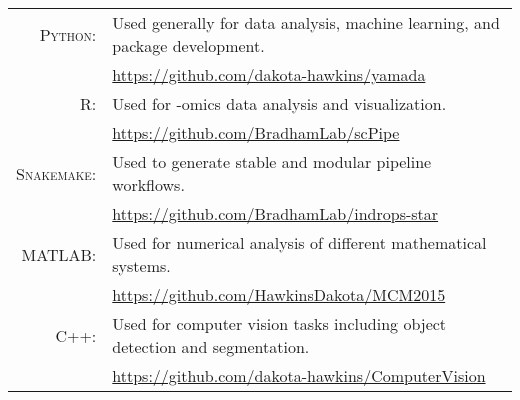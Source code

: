 \documentclass[a4paper,10pt]{article}
\begin{document}
\section{\color{linkcolour}{Programming Languages}}
\begin{tabular}{rl}
	\textsc{Python:}& Used generally for data analysis, machine learning, and package development.\\
		& \small{\href{https://github.com/dakota-hawkins/yamada}{https://github.com/dakota-hawkins/yamada}}\\
	\textsc{R:}& Used for -omics data analysis and visualization.\\
		& \small{\href{https://github.com/BradhamLab/scPipe}{https://github.com/BradhamLab/scPipe}} \\
	\textsc{Snakemake:} & Used to generate stable and modular pipeline workflows. \\
		&\small{\href{https://github.com/BradhamLab/indrops-star}{https://github.com/BradhamLab/indrops-star}} \\
	\textsc{MATLAB:}& Used for numerical analysis of different mathematical systems.\\
		& \small{\href{https://github.com/HawkinsDakota/MCM2015}{https://github.com/HawkinsDakota/MCM2015}}\\
	\textsc{C++:} & Used for computer vision tasks including object detection and segmentation.\\
		& \small{\href{https://github.com/dakota-hawkins/ComputerVision}{https://github.com/dakota-hawkins/ComputerVision}} \\
\end{tabular}
\end{document}
